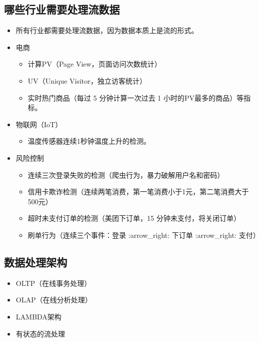 \hypertarget{ux54eaux4e9bux884cux4e1aux9700ux8981ux5904ux7406ux6d41ux6570ux636e}{%
\subsection{哪些行业需要处理流数据}\label{ux54eaux4e9bux884cux4e1aux9700ux8981ux5904ux7406ux6d41ux6570ux636e}}

\begin{itemize}
\tightlist
\item
  所有行业都需要处理流数据，因为数据本质上是流的形式。
\item
  电商

  \begin{itemize}
  \tightlist
  \item
    计算PV（Page View，页面访问次数统计）
  \item
    UV（Unique Visitor，独立访客统计）
  \item
    实时热门商品（每过 5 分钟计算一次过去 1 小时的PV最多的商品）等指标。
  \end{itemize}
\item
  物联网（IoT）

  \begin{itemize}
  \tightlist
  \item
    温度传感器连续1秒钟温度上升的检测。
  \end{itemize}
\item
  风险控制

  \begin{itemize}
  \tightlist
  \item
    连续三次登录失败的检测（爬虫行为，暴力破解用户名和密码）
  \item
    信用卡欺诈检测（连续两笔消费，第一笔消费小于1元，第二笔消费大于500元）
  \item
    超时未支付订单的检测（美团下订单，15 分钟未支付，将关闭订单）
  \item
    刷单行为（连续三个事件：登录 :arrow\_right: 下订单 :arrow\_right:
    支付）
  \end{itemize}
\end{itemize}

\hypertarget{ux6570ux636eux5904ux7406ux67b6ux6784}{%
\subsection{数据处理架构}\label{ux6570ux636eux5904ux7406ux67b6ux6784}}

\begin{itemize}
\tightlist
\item
  OLTP（在线事务处理）
\item
  OLAP（在线分析处理）
\item
  LAMBDA架构
\item
  有状态的流处理
\end{itemize}

